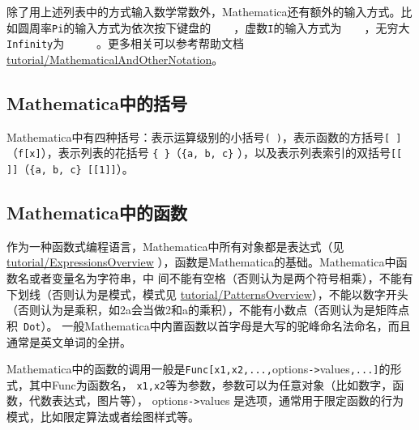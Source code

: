 \documentclass[UTF8,a4paper,10pt]{ctexart}
\newcommand{\mma}{Mathematica}
\begin{document}
除了用上述列表中的方式输入数学常数外，\mma 还有额外的输入方式。比如圆周率\verb|Pi|的输入方式为依次按下键盘的~~~~，虚数\verb|I|的输入方式为~~~~，无穷大\verb|Infinity|为
~~~~~。更多相关可以参考帮助文档
\href{http://reference.wolfram.com/language/tutorial/MathematicalAndOtherNotation.html}{tutorial/MathematicalAndOtherNotation}。



\subsection{Mathematica中的括号}

Mathematica中有四种括号：表示运算级别的小括号\verb|( )|，表示函数的方括号\verb|[ ]|（\verb|f[x]|），表示列表的花括号  \verb|{ }|（\verb|{a, b, c}| ），以及表示列表索引的双括号\verb|[[ ]]|（\verb|{a, b, c} [[1]]|）。

\subsection{Mathematica中的函数}

作为一种函数式编程语言，Mathematica中所有对象都是表达式（见
\href{http://reference.wolfram.com/language/tutorial/ExpressionsOverview.html}{tutorial/ExpressionsOverview}
），函数是Mathematica的基础。Mathematica中函数名或者变量名为字符串，中
间不能有空格（否则认为是两个符号相乘），不能有下划线（否则认为是模式，模式见
\href{http://reference.wolfram.com/language/tutorial/PatternsOverview.html}{tutorial/PatternsOverview}），不能以数字开头（否则认为是乘积，如2a会当做2和a的乘积），不能有小数点（否则认为是矩阵点积~\verb|Dot|）。
一般Mathematica中内置函数以首字母是大写的驼峰命名法命名，而且通常是英文单词的全拼。

Mathematica中的函数的调用一般是\verb|Func[x1,x2,...,|options\verb|->|values\verb|,...]|的形式，其中Func为函数名，
\verb|x1,x2|等为参数，参数可以为任意对象（比如数字，函数，代数表达式，图片等），
options\verb|->|values 是选项，通常用于限定函数的行为模式，比如限定算法或者绘图样式等。
\end{document}
